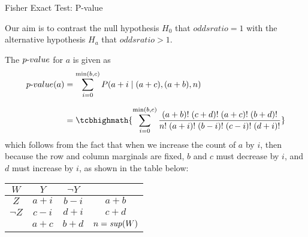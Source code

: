 \begin{frame}{F{i}sher Exact Test: P-value}

Our aim is to contrast the null hypothesis $H_0$ that $oddsratio =
1$ with the alternative hypothesis $H_a$ that $oddsratio > 1$.

The ${p\text{-}value}$ for $a$ is given as
\begin{align*}
  \pvalue(a) & = \sum_{i=0}^{\min(b,c)} P(a+i \mid (a+c),(a+b),n)\\[6pt]
  & =
\tcbhighmath{
  \sum_{i=0}^{\min(b,c)}
  \frac{(a+b)!\;(c+d)!\;(a+c)!\;(b+d)!}{n!\;(a+i)!\;(b-i)!\;(c-i)!\;(d+i)!}
}
\end{align*}
which follows from the fact that when we increase the count of $a$
by $i$, then because the row and column marginals are f\/{i}xed, $b$
and $c$ must decrease by $i$, and $d$ must increase by $i$, as
shown in the table below:
\begin{center} 
\begin{tabular}{|c|cc||c|}
    \hline
    $W$ & $Y$ & $\neg Y$ & \\
    \hline
    $Z$ & $a+i$ & $b-i$ & $a+b$\\
  $\neg Z$ & $c-i$ & $d+i$ & $c+d$\\
  \hline\hline
  & $a+c$ & $b+d$ & $n=\mathit{sup}(W)$\\
  \hline
  \end{tabular}%
\end{center}
\end{frame}


